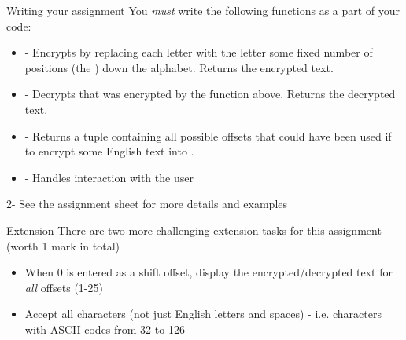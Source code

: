 \documentclass[week3]{csse1001}
\begin{document}
\begin{topic}{Writing your assignment}
You \textit{must} write the following functions as a part of your code:\\

\begin{itemize}
\item {} - Encrypts  by replacing each letter with the letter some fixed number of positions (the ) down the alphabet. Returns the encrypted text.
\item {} - Decrypts  that was encrypted by the function above. Returns the decrypted text.
\item {} - Returns a tuple containing all possible offsets that could have been used if to encrypt some English text into .
\item {} - Handles interaction with the user
\end{itemize}

\begin{subtopic}{2-}
See the assignment sheet for more details and examples
\end{subtopic}

\end{topic}

\begin{topic}{Extension}
There are two more challenging extension tasks for this assignment (worth 1 mark in total)\\

\begin{itemize}
\item When 0 is entered as a shift offset, display the encrypted/decrypted text for \textit{all} offsets (1-25)
\item Accept all characters (not just English letters and spaces) - i.e. characters with ASCII codes from 32 to 126
\end{itemize}

\end{topic}
\end{document}
